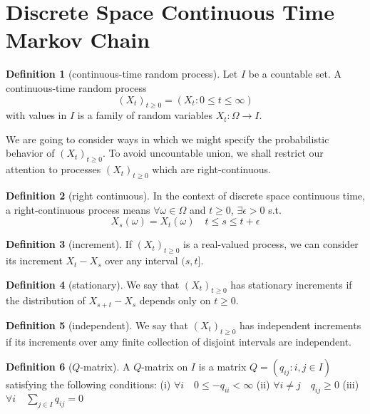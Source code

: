 \documentclass{article}
\theoremstyle{definition}
\newtheorem{Def}{Definition}[section]
\renewcommand{\leq}{\leqslant}
\renewcommand{\geq}{\geqslant}
\newcommand{\<}{\left\langle}
\renewcommand{\>}{\right\rangle}
\begin{document}
\section{Discrete Space Continuous Time Markov Chain}

\begin{Def}[continuous-time random process]
    Let $I$ be a countable set. A continuous-time random process \[(X_t)_{t\geq 0}=(X_t:0\leq t\leq\infty)\] 
    with values in $I$ is a family of random variables $X_t:\Omega\to I$.
\end{Def}
We are going to consider ways in which we might specify the probabilistic behavior of $(X_t)_{t\geq 0}$.
To avoid uncountable union, we shall restrict our attention to processes $(X_t)_{t\geq 0}$ which are right-continuous.
\begin{Def}[right continuous]
    In the context of discrete space continuous time, a right-continuous process means $\forall \omega\in\Omega$
    and $t\geq 0$, $\exists \epsilon>0$ s.t. \[X_s(\omega)=X_t(\omega)\quad t\leq s\leq t+\epsilon\]
\end{Def}
\begin{Def}[increment]
    If $(X_t)_{t\geq 0}$ is a real-valued process, we can consider its increment $X_t-X_s$ over any interval $(s,t]$.
\end{Def}
\begin{Def}[stationary]
    We say that $(X_t)_{t\geq 0}$ has stationary increments if the distribution of $X_{s+t}-X_s$ depends only on $t\geq 0$.
\end{Def}
\begin{Def}[independent]
    We say that $(X_t)_{t\geq 0}$ has independent increments if its increments over amy finite collection of disjoint intervals are independent.
\end{Def}
\begin{Def}[$Q$-matrix]
    A $Q$-matrix on $I$ is a matrix $Q=(q_{ij}:i,j\in I)$ satisfying the following conditions:\newline
(i) $\forall i\quad 0\leq -q_{ii}<\infty$ \newline 
(ii) $\forall i\ne j\quad q_{ij}\geq 0$\newline 
(iii) $\forall i\quad \sum_{j\in I}q_{ij}=0$
\end{Def}
\end{document}
